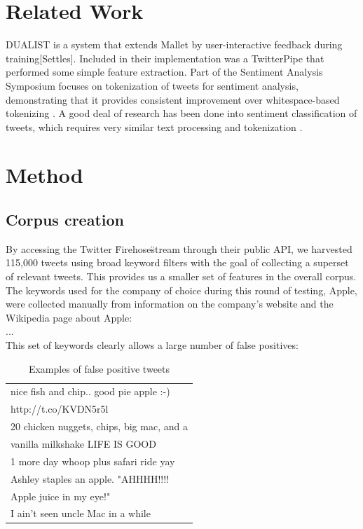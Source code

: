 \documentclass[letterpaper]{article}
\begin{document}
\section{Related Work}
DUALIST is a system that extends Mallet by user-interactive feedback during training[Settles]. Included in their implementation was a TwitterPipe that performed some simple feature extraction. 
Part of the Sentiment Analysis Symposium focuses on tokenization of tweets for sentiment analysis, demonstrating that it provides consistent improvement over whitespace-based tokenizing \cite{potts2011}. A good deal of research has been done into sentiment classification of tweets, which requires very similar text processing and tokenization \cite{Pak10}. 

\section{Method}
\subsection{Corpus creation}
By accessing the Twitter \"Firehose\" stream through their public API, we harvested 115,000 tweets using broad keyword filters with the goal of collecting a superset of relevant tweets. This provides us a smaller set of features in the overall corpus. The keywords used for the company of choice during this round of testing, Apple, were collected manually from information on the company's website and the Wikipedia page about Apple:\\
...\\

This set of keywords clearly allows a large number of false positives:

\begin{table}[h]
\centering
\begin{tabular}{|l|}
	\hline
	nice fish and chip.. good pie apple :-) \\ http://t.co/KVDN5r5l \\ \hline
	20 chicken nuggets, chips, big mac, and a \\ vanilla milkshake LIFE IS GOOD \\ \hline
	1 more day whoop plus safari ride yay \\ \hline
	Ashley staples an apple.  "AHHHH!!!! \\ Apple juice in my eye!" \\ \hline
	I ain't seen uncle Mac in a while \\
	\hline
\end{tabular}
\caption{Examples of false positive tweets}
\label{tab:myfirsttable}
\end{table}
\end{document}
